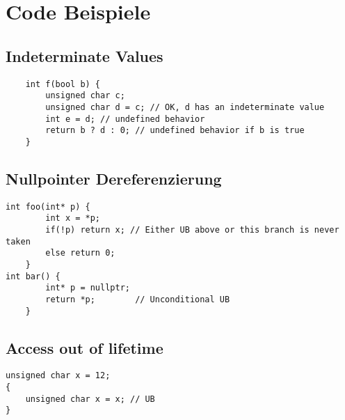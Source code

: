 \lstset{language=cpp}

\section{Code Beispiele}
\label{sec:codebsp}

\subsection{Indeterminate Values}
\label{subsec:indeterminate}
\begin{lstlisting}
    int f(bool b) {
        unsigned char c;
        unsigned char d = c; // OK, d has an indeterminate value
        int e = d; // undefined behavior
        return b ? d : 0; // undefined behavior if b is true
    }
\end{lstlisting}
\cite[S.63 f.]{book:cpp-standard}

\subsection{Nullpointer Dereferenzierung}
\label{subsec:nullpointer}

\begin{lstlisting}
int foo(int* p) {
        int x = *p;
        if(!p) return x; // Either UB above or this branch is never taken
        else return 0;
    }
int bar() {
        int* p = nullptr;
        return *p;        // Unconditional UB
    }
\end{lstlisting}
\cite{misc:cpp-undefined}

\subsection{Access out of lifetime}
\label{subsec:outside-lifetime}

\begin{lstlisting}
unsigned char x = 12;
{ 
    unsigned char x = x; // UB
}
\end{lstlisting}
\cite[S.35]{book:cpp-standard}
